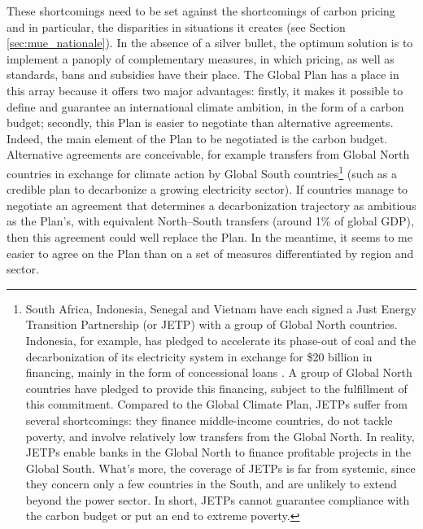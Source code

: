 \documentclass[a5paper,english,openany]{memoir}
\begin{document}
These shortcomings need to be set against the shortcomings of carbon pricing and in particular, %
the disparities in situations it creates (see Section \ref{sec:mue_nationale}). %
In the absence of a silver bullet, the optimum solution is to implement a panoply of complementary measures, in which pricing, %
as well as standards, bans and subsidies have their place. The Global Plan has a place in this array %
because it offers two major advantages: firstly, it makes it possible to define and guarantee an international climate ambition, in the form of a carbon budget; secondly, this Plan is easier to negotiate than alternative agreements. Indeed, the main element of the Plan to be negotiated is the carbon budget. Alternative agreements are conceivable, for example transfers from Global North countries in exchange for climate action by Global South countries\footnote{South Africa, Indonesia, Senegal and Vietnam have each signed a Just Energy Transition Partnership (or JETP) with a group of Global North countries. Indonesia, for example, has pledged to accelerate its phase-out of coal and the decarbonization %
of its electricity system in exchange for \$20 billion in financing, mainly in the form of concessional loans \citep{ha-duong_just_2023}. A group of Global North countries have pledged to provide this financing, subject to the fulfillment %
of this commitment. Compared to the Global Climate Plan, JETPs suffer from several shortcomings: they finance middle-income %
countries, do not tackle poverty, and involve relatively low transfers from the Global North. In reality, JETPs enable banks in the Global North to finance profitable projects in the Global South. What's more, the coverage of JETPs is far from systemic, since they concern only a few countries in the South, and are unlikely to extend beyond the power sector. In short, JETPs cannot guarantee compliance with the carbon budget or put an end to extreme poverty.} 
(such as a credible plan to decarbonize a growing electricity sector). If countries manage to negotiate an agreement that determines a decarbonization trajectory as ambitious as the Plan's, with equivalent North--South transfers (around 1\% of global GDP), then this agreement could well replace the Plan. In the meantime, it seems to me easier to agree on the Plan than on a set of measures differentiated by region and sector.
\end{document}
